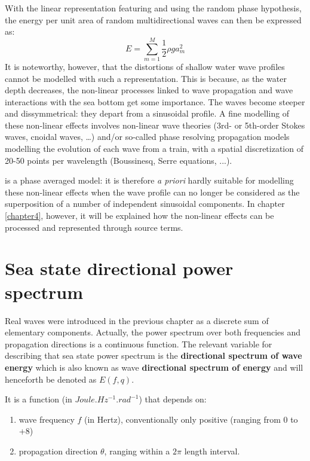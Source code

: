  With the linear representation featuring \tomawac and using the random phase hypothesis, the energy per unit area of random multidirectional waves can then be expressed as:
\begin{equation} \label{GrindEQ__2_5_}
E=\sum _{m=1}^{M}\frac{1}{2} \rho ga_{m}^{2}
\end{equation}
It is noteworthy, however, that the distortions of shallow water wave profiles cannot be modelled with such a representation. This is because, as the water depth decreases, the non-linear processes linked to wave propagation and wave interactions with the sea bottom get some importance. The waves become steeper and dissymmetrical: they depart from a sinusoidal profile. A fine modelling of these non-linear effects involves non-linear wave theories (3rd- or 5th-order Stokes waves, cnoidal waves, \dots ) and/or so-called phase resolving propagation models modelling the evolution of each wave from a train, with a spatial discretization of 20-50 points per wavelength (Boussinesq, Serre equations, ...).

 \tomawac is a phase averaged model: it is therefore \textit{a priori} hardly suitable for modelling these non-linear effects when the wave profile can no longer be considered as the superposition of a number of independent sinusoidal components. In chapter \ref{chapter4}, however, it will be explained how the non-linear effects can be processed and represented through source terms.


\section{ Sea state directional power spectrum}
 Real waves were introduced in the previous chapter as a discrete sum of elementary components. Actually, the power spectrum over both frequencies and propagation directions is a continuous function. The relevant variable for describing that sea state power spectrum is the \textbf{directional spectrum of wave energy} which is also known as wave \textbf{directional spectrum of energy} and will henceforth be denoted as $E(f,q)$.

 It is a function (in $Joule.Hz^{-1}.rad^{-1}$) that depends on:

 \begin{enumerate}
\item wave frequency $f$ (in Hertz), conventionally only positive (ranging from 0 to +8)
 \item propagation direction $\theta$, ranging within a $2\pi$ length interval.
\end{enumerate}

